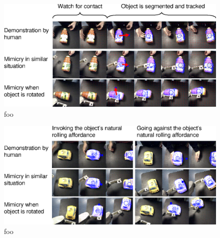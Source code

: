 




\begin{figure}[tbh]
  \centerline{\includegraphics[width=\textwidth]{fig-mimicry-bottle}}
  \caption{foo} 
\end{figure}


\begin{figure}[tbh]
  \centerline{\includegraphics[width=\textwidth]{fig-mimicry-awkward}}
  \caption{foo} 
\end{figure}
